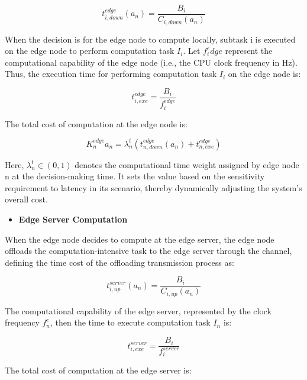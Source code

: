 \documentclass[preprint,12pt,authoryear]{elsarticle}
\begin{document}
\begin{equation}
    t_{i,down}^{edge} (a_n )=\frac{B_i}{C_{i,down} (a_n )} 
\end{equation}


When the decision is for the edge node to compute locally, subtask i is executed on the edge node to perform computation task \(I_i\). Let \(f_i^edge\) represent the computational capability of the edge node (i.e., the CPU clock frequency in Hz). Thus, the execution time for performing computation task \(I_i\) on the edge node is:

\begin{equation}
    t_{i,exe}^{edge}=\frac{B_i}{f_i^{edge}}
\end{equation}

The total cost of computation at the edge node is:

\begin{equation}
    K_n^{edge} {a_n}=\lambda_n^t (t_{n,down}^{edge} (a_n )+t_{n,exe}^{edge} )
\end{equation}


Here, \(\lambda^t_n \in (0,1)\) denotes the computational time weight assigned by edge node n at the decision-making time. It sets the value based on the sensitivity requirement to latency in its scenario, thereby dynamically adjusting the system's overall cost.

\begin{itemize}
    \item {\fontsize{11}{\baselineskip}\selectfont\textbf{Edge Server Computation}}
\end{itemize}

When the edge node decides to compute at the edge server, the edge node offloads the computation-intensive task to the edge server through the channel, defining the time cost of the offloading transmission process as:

\begin{equation}
    t_{i,up}^{server} (a_n )=\frac{B_i}{C_{i,up} (a_n )} 
\end{equation}

The computational capability of the edge server, represented by the clock frequency \(f_n^c\), then the time to execute computation task \(I_n\) is:

\begin{equation}
    t_{i,exe}^{server}=\frac{B_i}{f_i^{server}}
\end{equation}

The total cost of computation at the edge server is:
\end{document}

